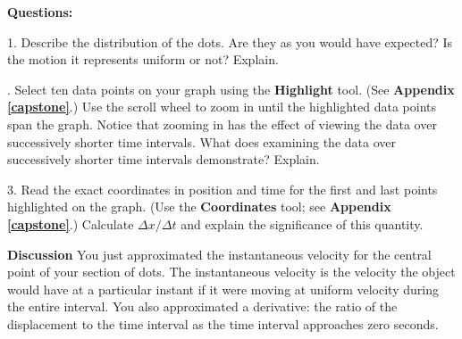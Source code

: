 \medskip

{\noindent \bf Questions:}

1. Describe the distribution of the dots. Are they as you would have expected?
Is the motion it represents uniform or not? Explain. 
\answerspace{20mm}

. Select ten data points on your graph using the \textbf{Highlight} tool. (See \textbf{Appendix \ref{capstone}}.) Use the scroll wheel to zoom in until the highlighted data points span the graph. Notice that zooming in has the effect of viewing the data over successively shorter time intervals. What does examining the data over successively shorter
time intervals demonstrate? Explain.
\answerspace{20mm}

3. Read the exact coordinates in position and time for the first and last points highlighted on the graph. (Use the \textbf{Coordinates} tool; see \textbf{Appendix \ref{capstone}}.)  Calculate \( \Delta x/\Delta t \) and explain the significance of this quantity.
\answerspace{20mm}

{\noindent \bf Discussion} You just approximated the instantaneous velocity for the central point of your section of dots. The instantaneous velocity is the velocity the object would have at a particular instant if it were moving at uniform velocity during the entire interval. You also approximated a derivative: the ratio of the displacement to the time interval as the time interval approaches zero seconds. 

